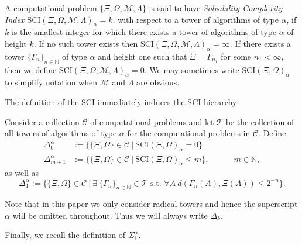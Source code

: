 \documentclass[a4paper,10pt]{article}
\begin{document}
\begin{definition}\label{complex_ind}
A computational problem $\{\Xi,\Omega,\mathcal{M},\Lambda\}$ is said to have \emph{Solvability Complexity Index $\mathrm{SCI}(\Xi,\Omega,\mathcal{M},\Lambda)_{\alpha} = k$}, with respect to a tower of algorithms of type $\alpha$, if $k$ is the smallest integer for which there exists a tower of algorithms of type $\alpha$ of height $k$. If no such tower exists then $\mathrm{SCI}(\Xi,\Omega,\mathcal{M},\Lambda)_{\alpha} = \infty.$ If there exists a tower $\{\Gamma_n\}_{n\in\mathbb{N}}$ of type $\alpha$ and height one such that $\Xi = \Gamma_{n_1}$ for some $n_1 < \infty$, then we define $\mathrm{SCI}(\Xi,\Omega,\mathcal{M},\Lambda)_{\alpha} = 0$. We may sometimes write $\mathrm{SCI}(\Xi,\Omega)_{\alpha}$ to simplify notation when $\mathcal{M}$ and $\Lambda$ are obvious. 
\end{definition}

 The definition of the SCI immediately induces the SCI hierarchy:

\begin{definition}
\label{1st_SCI}
Consider a collection $\mathcal{C}$ of computational problems and let $\mathcal{T}$ be the collection of all towers of algorithms of type $\alpha$ for the computational problems in $\mathcal{C}$.
Define 
\begin{equation*}
\begin{split}
\Delta^{\alpha}_0 &:= \{\{\Xi,\Omega\} \in \mathcal{C} \ \vert \   \mathrm{SCI}(\Xi,\Omega)_{\alpha} = 0\}\\
\Delta^{\alpha}_{m+1} &:= \{\{\Xi,\Omega\}  \in \mathcal{C} \ \vert \   \mathrm{SCI}(\Xi,\Omega)_{\alpha} \leq m\}, \qquad \quad m \in \mathbb{N},
\end{split}
\end{equation*}
as well as
\[
\Delta^{\alpha}_{1} := \{\{\Xi,\Omega\}  \in \mathcal{C}   \  \vert \ \exists \ \{\Gamma_n\}_{n\in \mathbb{N}} \in \mathcal{T}\text{ s.t. } \forall A \ d(\Gamma_n(A),\Xi(A)) \leq 2^{-n}\}. 
\]
\end{definition}

\begin{remark}
Note that in this paper we only consider radical towers and hence the superscript $\alpha$ will be omitted throughout. Thus we will always write $\Delta_k$.
\end{remark}

Finally, we recall the definition of $\Sigma_1^{\alpha}$. 
\end{document}
